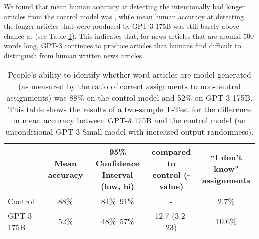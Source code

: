 \documentclass{article}
\begin{document}
 We found that mean human accuracy at detecting the intentionally bad longer articles from the control model was , while mean human accuracy at detecting the longer articles that were produced by GPT-3 175B was still barely above chance at  (see Table \ref{table:generation_long}). This indicates that, for news articles that are around 500 words long, GPT-3 continues to produce articles that humans find difficult to distinguish from human written news articles.
 
 \begin{table}
    \centering
        \begin{tabular}{l c c c c}
        \toprule
         & Mean accuracy & \shortstack{95\% Confidence \\Interval (low, hi)} & \shortstack{ compared to \\ control (-value)} & \shortstack{``I don't know" \\ assignments} \\ 
        \midrule
Control & 88\% & 84\%–91\% & - & 2.7\% \\ 
GPT-3 175B   & 52\% & 48\%–57\% & 12.7 (3.2-23) & 10.6\% \\ 
        \bottomrule
        \end{tabular}
    \caption{People’s ability to identify whether  word articles are model generated (as measured by the ratio of correct assignments to non-neutral assignments) was 88\% on the control model and 52\% on GPT-3 175B. This table shows the results of a two-sample T-Test for the difference in mean accuracy between GPT-3 175B and the control model (an unconditional GPT-3 Small model with increased output randomness).}
    \label{table:generation_long}
\end{table}  
\end{document}
